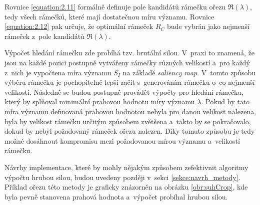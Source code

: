 Rovnice \ref{equation:2.11} formálně definuje pole kandidátů rámečku ořezu $\Re(\lambda)$, tedy všech rámečků, které mají dostatečnou míru významu. Rovnice \ref{equation:2.12} pak určuje, že optimální rámeček $R_C$ bude vybrán jako nejmenší rámeček z~pole kandidátů $\Re(\lambda)$.

Výpočet hledání rámečku zde probíhá tzv. brutální silou. V~praxi to znamená, že jsou na každé pozici postupně vytvářeny rámečky různých velikostí a~pro každý z~nich je vypočtena míra významu $S_I$ na základě \emph{saliency map}. V~tomto způsobu výběru rámečku je pochopitelně lepší začít s~generováním rámečku o~co nejmenší velikosti. Následně se budou postupně provádět výpočty pro hledání rámečku, který by splňoval minimální prahovou hodnotu míry významu $\lambda$. Pokud by tato míra významu definovaná prahovou hodnotou nebyla pro danou velikost nalezena, byla by velikost rámečku určitým způsobem zvětšena a~takto by se pokračovalo, dokud by nebyl požadovaný rámeček ořezu nalezen. Díky tomuto způsobu je tedy možné dosáhnout kompromisu mezi požadovanou mírou významu a~velikostí rámečku.

Návrhy implementace, které by mohly nějakým způsobem zefektivnit algoritmy výpočtu hrubou silou, budou uvedeny později v~sekci \ref{sekce:navrh_metody}. Příklad ořezu této metody je graficky znázorněn na obrázku \ref{obr:suhCrop}, kde byla pevně stanovena prahová hodnota a~výpočet probíhal hrubou silou.

